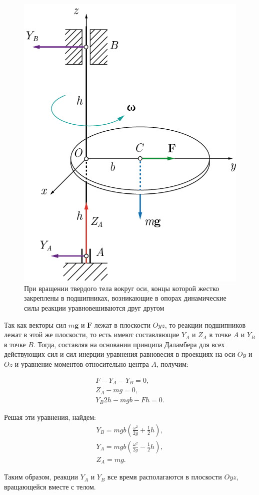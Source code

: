 \documentclass[14pt,a4paper,oneside]{extarticle}	%
\begin{document}
\begin{figure}[H] 	
	\centering 		
	\includegraphics[width=0.5\linewidth]{freeaxis-5.png}
	\caption{При вращении твердого тела вокруг оси, концы которой жестко закреплены в подшипниках, возникающие в опорах динамические силы реакции уравновешиваются друг другом}
	\label{freeaxis-5}
\end{figure}

Так как векторы сил $ m\textbf{g} $ и $ \textbf{F} $ лежат в плоскости $ Oyz $, то реакции подшипников лежат в этой же плоскости, то есть имеют составляющие $ Y_{A} $ и $ Z_{A} $ в точке $ A $ и $ Y_{B} $ в точке $ B $. 
Тогда, составляя на основании принципа Даламбера для всех действующих сил и сил инерции уравнения равновесия в проекциях на оси $ Oy $ и $ Oz $ и уравнение моментов относительно центра $ A $, получим:

\begin{eqnarray}\label{freeaxis-eq1}
F -  Y_{A} -  Y_{B} = 0, \\
Z_{A} - mg = 0,\\
Y_{B}2h - mgb-Fh=0.
\end{eqnarray}

Решая эти уравнения, найдем:
\begin{eqnarray}\label{freeaxis-eq2}
Y_{B} = mgb\left(\frac{\omega^{2}}{2g} + \frac{1}{2}h\right), \\
Y_{A} = mgb\left(\frac{\omega^{2}}{2g} - \frac{1}{2}h\right),\\
Z_{A} = mg.
\end{eqnarray}

Таким образом, реакции $ Y_{A} $ и $ Y_{B} $ все время располагаются в плоскости $ Oyz $, вращающейся вместе с телом.
\end{document}
